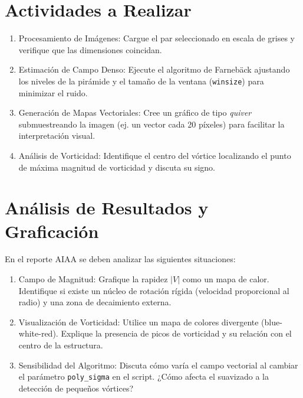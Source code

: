 \documentclass[11pt, a4paper]{article}
\begin{document}
\section{Actividades a Realizar}
\begin{enumerate}
    \item Procesamiento de Imágenes: Cargue el par seleccionado en escala de grises y verifique que las dimensiones coincidan.
    \item Estimación de Campo Denso: Ejecute el algoritmo de Farnebäck ajustando los niveles de la pirámide y el tamaño de la ventana (\texttt{winsize}) para minimizar el ruido.
    \item Generación de Mapas Vectoriales: Cree un gráfico de tipo \textit{quiver} submuestreando la imagen (ej. un vector cada 20 píxeles) para facilitar la interpretación visual.
    \item Análisis de Vorticidad: Identifique el centro del vórtice localizando el punto de máxima magnitud de vorticidad y discuta su signo.
\end{enumerate}

\section{Análisis de Resultados y Graficación}
En el reporte AIAA se deben analizar las siguientes situaciones:
\begin{enumerate}
    \item Campo de Magnitud: Grafique la rapidez $|V|$ como un mapa de calor. Identifique si existe un núcleo de rotación rígida (velocidad proporcional al radio) y una zona de decaimiento externa.
    \item Visualización de Vorticidad: Utilice un mapa de colores divergente (blue-white-red). Explique la presencia de picos de vorticidad y su relación con el centro de la estructura.
    \item Sensibilidad del Algoritmo: Discuta cómo varía el campo vectorial al cambiar el parámetro \texttt{poly\_sigma} en el script. ¿Cómo afecta el suavizado a la detección de pequeños vórtices?
\end{enumerate}
\end{document}
